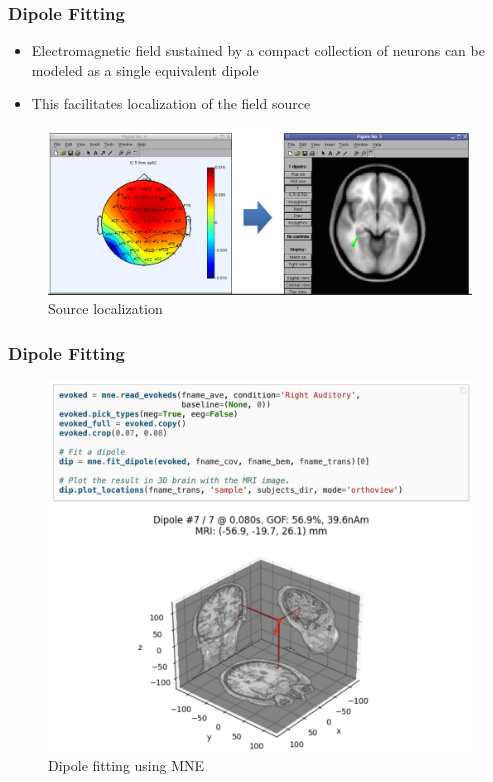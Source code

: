 \documentclass{beamer}
\begin{document}
\begin{frame}
\frametitle{Dipole Fitting}
\begin{itemize}
	\item Electromagnetic field sustained by a compact collection of neurons can be modeled as a single equivalent dipole
	\item This facilitates localization of the field source
\end{itemize}
	\begin{figure}
		\includegraphics[width=0.8\linewidth]{image/dipole}
		\caption{Source localization}
	\end{figure}
\end{frame}

\begin{frame}
\frametitle{Dipole Fitting}
	\begin{figure}
		\includegraphics[width=0.7\linewidth]{image/dipolefitting}
		\caption{Dipole fitting using MNE}
	\end{figure}
\end{frame}
\end{document}
